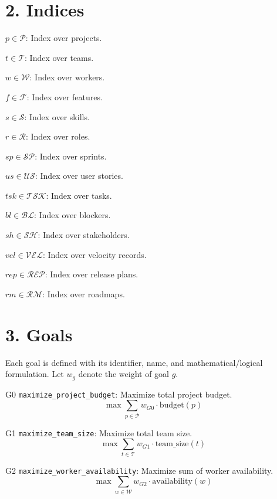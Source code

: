 \documentclass[12pt]{article}
\begin{document}
\section{2. Indices}

\item $p \in \mathcal{P}$: Index over projects.
    \item $t \in \mathcal{T}$: Index over teams.
    \item $w \in \mathcal{W}$: Index over workers.
    \item $f \in \mathcal{F}$: Index over features.
    \item $s \in \mathcal{S}$: Index over skills.
    \item $r \in \mathcal{R}$: Index over roles.
    \item $sp \in \mathcal{SP}$: Index over sprints.
    \item $us \in \mathcal{US}$: Index over user stories.
    \item $tsk \in \mathcal{TSK}$: Index over tasks.
    \item $bl \in \mathcal{BL}$: Index over blockers.
    \item $sh \in \mathcal{SH}$: Index over stakeholders.
    \item $vel \in \mathcal{VEL}$: Index over velocity records.
    \item $rep \in \mathcal{REP}$: Index over release plans.
    \item $rm \in \mathcal{RM}$: Index over roadmaps.

\section{3. Goals}

Each goal is defined with its identifier, name, and mathematical/logical formulation. Let $w_g$ denote the weight of goal $g$.

\item[G0] \texttt{maximize\_project\_budget}: Maximize total project budget.
    \[
    \max \sum_{p \in \mathcal{P}} w_{G0} \cdot \text{budget}(p)
    \]

    \item[G1] \texttt{maximize\_team\_size}: Maximize total team size.
    \[
    \max \sum_{t \in \mathcal{T}} w_{G1} \cdot \text{team\_size}(t)
    \]

    \item[G2] \texttt{maximize\_worker\_availability}: Maximize sum of worker availability.
    \[
    \max \sum_{w \in \mathcal{W}} w_{G2} \cdot \text{availability}(w)
    \]
\end{document}
